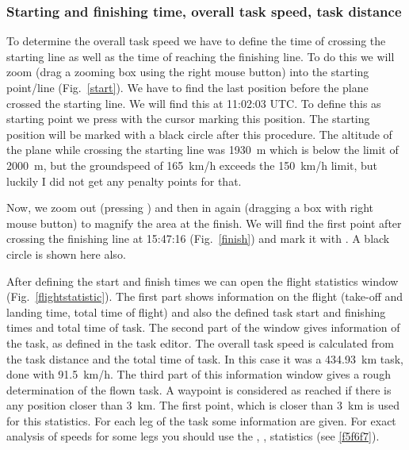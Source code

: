 \subsubsection{Starting and finishing time, overall task speed, task distance}
To determine the overall task speed we have to define the time of crossing the starting line as well as the time of reaching the finishing line.
To do this we will zoom (drag a zooming box using the right mouse button) into the starting point/line (Fig.~\ref{start}).
We have to find the last position before the plane crossed the starting line.
We will find this at 11:02:03 UTC. To define this as starting point we press  with the cursor marking this position.
The starting position will be marked with a black circle after this procedure.
The altitude of the plane while crossing the starting line was 1930~m which is below the limit of 2000~m, but the groundspeed of 165~km/h exceeds the 150~km/h limit,
but luckily I did not get any penalty points for that.

Now, we zoom out (pressing ) and then in again (dragging a box with right mouse button) to magnify the area at the finish.
We will find the first point after crossing the finishing line at 15:47:16 (Fig.~\ref{finish}) and mark it with .
A black circle is shown here also.

After defining the start and finish times we can open the flight statistics window (Fig.~\ref{flightstatistic}).
The first part shows information on the flight (take-off and landing time,
total time of flight) and also the defined task start and finishing times and total time of task.
The second part of the window gives information of the task, as defined in the task editor.
The overall task speed is calculated from the task distance and the total time of task.
In this case it was a 434.93~km task, done with 91.5~km/h. The third part of this information window gives a rough determination of the flown task.
A waypoint is considered as reached if there is any position closer than 3~km.
The first point, which is closer than 3~km is used for this statistics.
For each leg of the task some information are given. For exact analysis of speeds for some legs you should use the , ,  statistics (see \ref{f5f6f7}).


